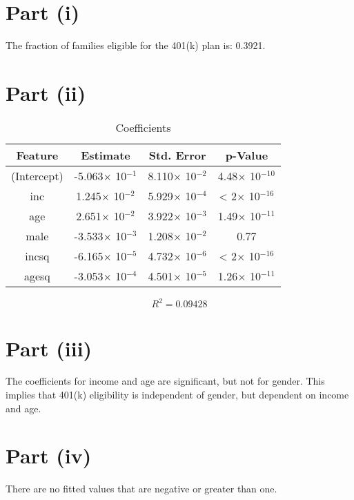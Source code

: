 \documentclass{./solution}
\begin{document}
    \begin{solution}[Wooldridge C7.9]
        \section{Part (i)}
            The fraction of families eligible for the 401(k) plan is: 0.3921.

        \section{Part (ii)}
            \begin{table}[H]
                \caption{Coefficients}
                \begin{tabularx}{\textwidth}{C C C C}
                    \toprule
                    Feature & Estimate & Std. Error & p-Value \\
                    \midrule
                    (Intercept) & -5.063$\times$ 10$^{-1}$ & 8.110$\times$ 10$^{-2}$ & 4.48$\times$ 10$^{-10}$ \\
                    inc         &  1.245$\times$ 10$^{-2}$ & 5.929$\times$ 10$^{-4}$ &  < 2$\times$ 10$^{-16}$ \\
                    age         &  2.651$\times$ 10$^{-2}$ & 3.922$\times$ 10$^{-3}$ & 1.49$\times$ 10$^{-11}$ \\
                    male        & -3.533$\times$ 10$^{-3}$ & 1.208$\times$ 10$^{-2}$ &     0.77 \\
                    incsq       & -6.165$\times$ 10$^{-5}$ & 4.732$\times$ 10$^{-6}$ &  < 2$\times$ 10$^{-16}$ \\
                    agesq       & -3.053$\times$ 10$^{-4}$ & 4.501$\times$ 10$^{-5}$ & 1.26$\times$ 10$^{-11}$ \\
                    \bottomrule
                \end{tabularx}
            \end{table}
            \vspace{-5mm}
            $$ R^2 = 0.09428 $$

        \section{Part (iii)}
            The coefficients for income and age are significant, but not for gender.
            This implies that 401(k) eligibility is independent of gender, but dependent on income and age.

        \section{Part (iv)}
            There are no fitted values that are negative or greater than one.


\end{solution}
\end{document}
